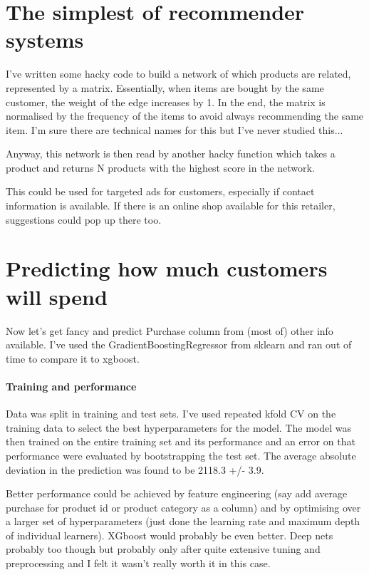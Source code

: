 \documentclass{article}
\begin{document}
\section{The simplest of recommender systems}

I've written some hacky code to build a network of which products are related, represented by a matrix. Essentially, when items are bought by the same customer, the weight of the edge increases by 1. In the end, the matrix is normalised by the frequency of the items to avoid always recommending the same item. I'm sure there are technical names for this but I've never studied this...

Anyway, this network is then read by another hacky function which takes a product and returns N products with the highest score in the network.

This could be used for targeted ads for customers, especially if contact information is available. If there is an online shop available for this retailer, suggestions could pop up there too.

\section{Predicting how much customers will spend}

Now let's get fancy and predict Purchase column from (most of) other info available. I've used the GradientBoostingRegressor from sklearn and ran out of time to compare it to xgboost.

\paragraph{Training and performance} Data was split in training and test sets. I've used repeated kfold CV on the training data to select the best hyperparameters for the model. The model was then trained on the entire training set and its performance and an error on that performance were evaluated by bootstrapping the test set. The average absolute deviation in the prediction was found to be 2118.3 +/- 3.9.

Better performance could be achieved by feature engineering (say add average purchase for product id or product category as a column) and by optimising over a larger set of hyperparameters (just done the learning rate and maximum depth of individual learners). XGboost would probably be even better. Deep nets probably too though but probably only after quite extensive tuning and preprocessing and I felt it wasn't really worth it in this case.
\end{document}
